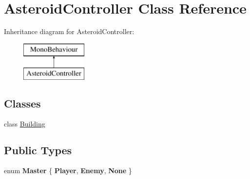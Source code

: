 \hypertarget{class_asteroid_controller}{}\section{Asteroid\+Controller Class Reference}
\label{class_asteroid_controller}
Inheritance diagram for Asteroid\+Controller\+:\begin{figure}[H]
\begin{center}
\leavevmode
\includegraphics[height=2.000000cm]{class_asteroid_controller}
\end{center}
\end{figure}
\subsection*{Classes}
\begin{DoxyCompactItemize}
\item 
class \hyperlink{class_asteroid_controller_1_1_building}{Building}
\end{DoxyCompactItemize}
\subsection*{Public Types}
\begin{DoxyCompactItemize}
\item 
\hypertarget{class_asteroid_controller_a6203d45c2ca3e0538b31a8335a936266}{}enum {\bfseries Master} \{ {\bfseries Player}, 
{\bfseries Enemy}, 
{\bfseries None}
 \}\label{class_asteroid_controller_a6203d45c2ca3e0538b31a8335a936266}

\end{DoxyCompactItemize}
